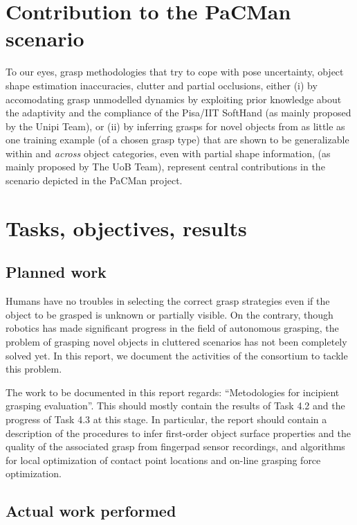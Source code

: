 \documentclass[a4paper,11pt,pdf]{pacmanreport}
\begin{document}
\section*{Contribution to the PaCMan scenario}

To our eyes, grasp methodologies that try to cope with pose uncertainty, object shape estimation inaccuracies, clutter and partial occlusions, either (i) by accomodating grasp unmodelled dynamics by exploiting prior knowledge about the adaptivity and the compliance of the Pisa/IIT SoftHand (as mainly proposed by the Unipi Team), or (ii) by inferring grasps for novel objects from as little as one training example (of a chosen grasp type) that are shown to be generalizable within and \emph{across} object categories, even with partial shape information, (as mainly proposed by The UoB Team), represent central contributions in the scenario depicted in the PaCMan project.


\newpage

\section{Tasks, objectives, results}

\subsection{Planned work}

Humans have no troubles in selecting the correct grasp strategies even if the object to be grasped is unknown or partially visible. On the contrary, though robotics has made significant progress in the field of autonomous grasping, the problem of grasping novel objects in cluttered scenarios has not been completely solved yet. In this report, we document the activities of the consortium to tackle this problem.

The work to be documented in this report regards: ``Metodologies for incipient grasping evaluation''. This should mostly contain the results of Task 4.2 and the progress of Task 4.3 at this stage. In particular, the report should contain a description of the procedures to infer first-order object surface properties and the quality of the associated grasp from fingerpad sensor recordings, and algorithms for local optimization of contact point locations and on-line grasping force optimization.


\subsection{Actual work performed}
\end{document}
